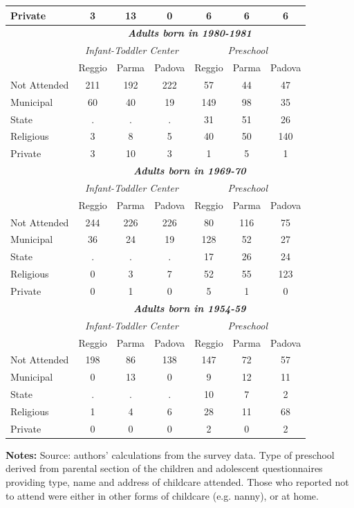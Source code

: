 \documentclass[12pt]{article}
\begin{document}
\begin{table}[ht]
\begin{center}
\begin{tabular}{lccc|ccc}
Private & 3 & 13 & 0 & 6 & 6 & 6 \\ \hline
\rule{0pt}{1.2\normalbaselineskip} & \multicolumn{6}{c}{\textit{\textbf{%
Adults born in 1980-1981}}} \\ 
& \multicolumn{3}{c}{\textit{Infant-Toddler Center}} & \multicolumn{3}{c}{%
\textit{Preschool}} \\ 
& Reggio & Parma & Padova & Reggio & Parma & Padova \\ \hline
Not Attended & 211 & 192 & 222 & 57 & 44 & 47 \\ 
Municipal & 60 & 40 & 19 & 149 & 98 & 35 \\ 
State & . & . & . & 31 & 51 & 26 \\ 
Religious & 3 & 8 & 5 & 40 & 50 & 140 \\ 
Private & 3 & 10 & 3 & 1 & 5 & 1 \\ \hline
\rule{0pt}{1.2\normalbaselineskip} & \multicolumn{6}{c}{\textit{\textbf{%
Adults born in 1969-70}}} \\ 
& \multicolumn{3}{c}{\textit{Infant-Toddler Center}} & \multicolumn{3}{c}{%
\textit{Preschool}} \\ 
& Reggio & Parma & Padova & Reggio & Parma & Padova \\ \hline
Not Attended & 244 & 226 & 226 & 80 & 116 & 75 \\ 
Municipal & 36 & 24 & 19 & 128 & 52 & 27 \\ 
State & . & . & . & 17 & 26 & 24 \\ 
Religious & 0 & 3 & 7 & 52 & 55 & 123 \\ 
Private & 0 & 1 & 0 & 5 & 1 & 0 \\ \hline
\rule{0pt}{1.2\normalbaselineskip} & \multicolumn{6}{c}{\textit{\textbf{%
Adults born in 1954-59}}} \\ 
& \multicolumn{3}{c}{\textit{Infant-Toddler Center}} & \multicolumn{3}{c}{%
\textit{Preschool}} \\ 
& Reggio & Parma & Padova & Reggio & Parma & Padova \\ \hline
Not Attended & 198 & 86 & 138 & 147 & 72 & 57 \\ 
Municipal & 0 & 13 & 0 & 9 & 12 & 11 \\ 
State & . & . & . & 10 & 7 & 2 \\ 
Religious & 1 & 4 & 6 & 28 & 11 & 68 \\ 
Private & 0 & 0 & 0 & 2 & 0 & 2 \\ \hline
\end{tabular}%
\end{center}
\par
\raggedright{\footnotesize {{\bfseries Notes:} Source: authors' calculations
from the survey data. Type of preschool derived from parental section of the
children and adolescent questionnaires providing type, name and address of
childcare attended. Those who reported not to attend were either in other
forms of childcare (e.g. nanny), or at home.} }
\end{table}
\end{document}
